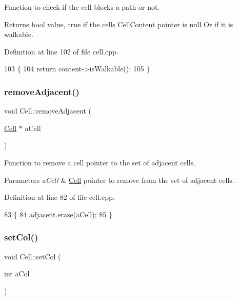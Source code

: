 Function to check if the cell blocks a path or not. \begin{DoxyReturn}{Returns}
bool value, true if the cell\textquotesingle{}s Cell\+Content pointer is null Or if it is walkable. 
\end{DoxyReturn}


Definition at line 102 of file cell.\+cpp.


\begin{DoxyCode}
103 \{
104     \textcolor{keywordflow}{return} content->isWalkable();
105 \}
\end{DoxyCode}
\hypertarget{class_cell_a5d9bda81ac204c982b084c7b02f4d6de}{}\label{class_cell_a5d9bda81ac204c982b084c7b02f4d6de} 
\subsubsection{\texorpdfstring{remove\+Adjacent()}{removeAdjacent()}}
{\footnotesize\ttfamily void Cell\+::remove\+Adjacent (\begin{DoxyParamCaption}\item[{\hyperlink{class_cell}{Cell} $\ast$}]{a\+Cell }\end{DoxyParamCaption})}

Function to remove a cell pointer to the set of adjacent cells. 
\begin{DoxyParams}{Parameters}
{\em a\+Cell} & \hyperlink{class_cell}{Cell} pointer to remove from the set of adjacent cells. \\
\hline
\end{DoxyParams}


Definition at line 82 of file cell.\+cpp.


\begin{DoxyCode}
83 \{
84     adjacent.erase(aCell);
85 \}
\end{DoxyCode}
\hypertarget{class_cell_a1985a73d12e0e439ec05317e220cafee}{}\label{class_cell_a1985a73d12e0e439ec05317e220cafee} 
\subsubsection{\texorpdfstring{set\+Col()}{setCol()}}
{\footnotesize\ttfamily void Cell\+::set\+Col (\begin{DoxyParamCaption}\item[{int}]{a\+Col }\end{DoxyParamCaption})}

